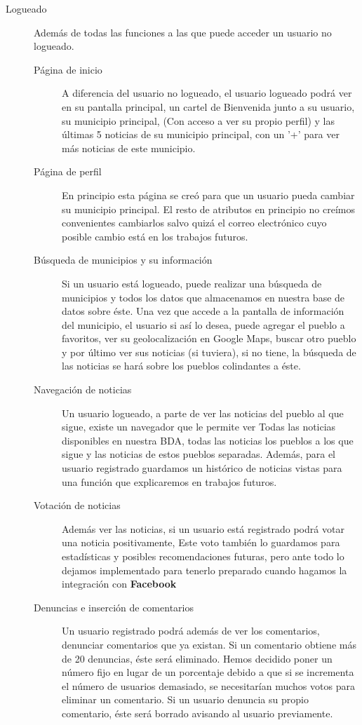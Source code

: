 \begin{description}
\item[Logueado]
	Además de todas las funciones a las que puede acceder un usuario no logueado.
	\begin{description}
		\item[Página de inicio]
			A diferencia del usuario no logueado, el usuario logueado podrá ver en su pantalla principal, un cartel de Bienvenida junto a su usuario, su municipio principal, (Con acceso a ver su propio perfil) y las últimas 5 noticias de su municipio principal, con un '+' para ver más noticias de este municipio.
		\item[Página de perfil]
			En principio esta página se creó para que un usuario pueda cambiar su municipio principal. El resto de atributos en principio no creímos convenientes cambiarlos salvo quizá el correo electrónico cuyo posible cambio está en los trabajos futuros.
		\item[Búsqueda de municipios y su información]
			Si un usuario está logueado, puede realizar una búsqueda de municipios y todos los datos que almacenamos en nuestra base de datos sobre éste. Una vez que accede a la pantalla de información del municipio, el usuario si así lo desea, puede agregar el pueblo a favoritos, ver su geolocalización en Google Maps, buscar otro pueblo y por último ver sus noticias (si tuviera), si no tiene, la búsqueda de las noticias se hará sobre los pueblos colindantes a éste. 
		\item[Navegación de noticias]
			Un usuario logueado, a parte de ver las noticias del pueblo al que sigue, existe un navegador que le permite ver Todas las noticias disponibles en nuestra BDA, todas las noticias los pueblos a los que sigue y las noticias de estos pueblos separadas. Además, para el usuario registrado guardamos un histórico de noticias vistas para una función que explicaremos en trabajos futuros.

		\item[Votación de noticias]
			Además ver las noticias, si un usuario está registrado podrá votar una noticia positivamente, Este voto también lo guardamos para estadísticas y posibles recomendaciones futuras, pero ante todo lo dejamos implementado para tenerlo preparado cuando hagamos la integración con \textbf{Facebook}
		\item[Denuncias e inserción de comentarios]
			Un usuario registrado podrá además de ver los comentarios, denunciar comentarios que ya existan. Si un comentario obtiene más de 20 denuncias, éste será eliminado. Hemos decidido poner un número fijo en lugar de un porcentaje debido a que si se incrementa el número de usuarios demasiado, se necesitarían muchos votos para eliminar un comentario. Si un usuario denuncia su propio comentario, éste será borrado avisando al usuario previamente.


\end{description}
\end{description}
